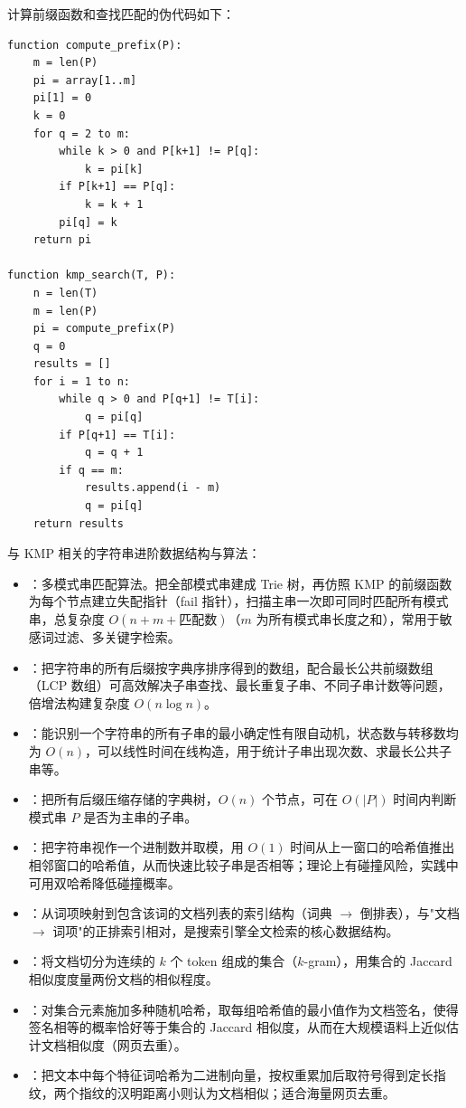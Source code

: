 \documentclass[12pt]{article}
\begin{document}
计算前缀函数和查找匹配的伪代码如下：
\begin{verbatim}
function compute_prefix(P):
    m = len(P)
    pi = array[1..m]
    pi[1] = 0
    k = 0
    for q = 2 to m:
        while k > 0 and P[k+1] != P[q]:
            k = pi[k]
        if P[k+1] == P[q]:
            k = k + 1
        pi[q] = k
    return pi

function kmp_search(T, P):
    n = len(T)
    m = len(P)
    pi = compute_prefix(P)
    q = 0
    results = []
    for i = 1 to n:
        while q > 0 and P[q+1] != T[i]:
            q = pi[q]
        if P[q+1] == T[i]:
            q = q + 1
        if q == m:
            results.append(i - m)
            q = pi[q]
    return results
\end{verbatim}

\begin{note}
  与 KMP 相关的字符串进阶数据结构与算法：
  \begin{itemize}
    \item {}：多模式串匹配算法。把全部模式串建成 Trie 树，再仿照 KMP 的前缀函数为每个节点建立失配指针（fail 指针），扫描主串一次即可同时匹配所有模式串，总复杂度 $O(n + m + \text{匹配数})$（$m$ 为所有模式串长度之和），常用于敏感词过滤、多关键字检索。
    \item {}：把字符串的所有后缀按字典序排序得到的数组，配合最长公共前缀数组（LCP 数组）可高效解决子串查找、最长重复子串、不同子串计数等问题，倍增法构建复杂度 $O(n\log n)$。
    \item {}：能识别一个字符串的所有子串的最小确定性有限自动机，状态数与转移数均为 $O(n)$，可以线性时间在线构造，用于统计子串出现次数、求最长公共子串等。
    \item {}：把所有后缀压缩存储的字典树，$O(n)$ 个节点，可在 $O(|P|)$ 时间内判断模式串 $P$ 是否为主串的子串。
    \item {}：把字符串视作一个进制数并取模，用 $O(1)$ 时间从上一窗口的哈希值推出相邻窗口的哈希值，从而快速比较子串是否相等；理论上有碰撞风险，实践中可用双哈希降低碰撞概率。
    \item {}：从词项映射到包含该词的文档列表的索引结构（词典 $\to$ 倒排表），与"文档 $\to$ 词项"的正排索引相对，是搜索引擎全文检索的核心数据结构。
    \item {}：将文档切分为连续的 $k$ 个 token 组成的集合（$k$-gram），用集合的 Jaccard 相似度度量两份文档的相似程度。
    \item {}：对集合元素施加多种随机哈希，取每组哈希值的最小值作为文档签名，使得签名相等的概率恰好等于集合的 Jaccard 相似度，从而在大规模语料上近似估计文档相似度（网页去重）。
    \item {}：把文本中每个特征词哈希为二进制向量，按权重累加后取符号得到定长指纹，两个指纹的汉明距离小则认为文档相似；适合海量网页去重。
  \end{itemize}
\end{note}
\end{document}
